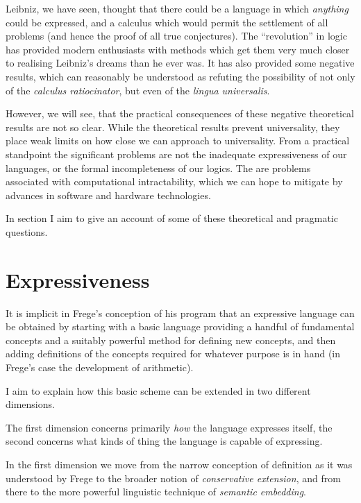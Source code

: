 Leibniz, we have seen, thought that there could be a language in which {\it anything} could be expressed, and a calculus which would permit the settlement of all problems (and hence the proof of all true conjectures).
The ``revolution'' in logic has provided modern enthusiasts with methods which get them very much closer to realising Leibniz's dreams than he ever was.
It has also provided some negative results, which can reasonably be understood as refuting the possibility of not only of the {\it calculus ratiocinator}, but even of the {\it lingua universalis}.

However, we will see, that the practical consequences of these negative theoretical results are not so clear.
While the theoretical results prevent universality, they place weak limits on how close we can approach to universality.
From a practical standpoint the significant problems are not the inadequate expressiveness of our languages, or the formal incompleteness of our logics.
The are problems associated with computational intractability, which we can hope to mitigate by advances in software and hardware technologies.

In section I aim to give an account of some of these theoretical and pragmatic questions.

\section{Expressiveness}

It is implicit in Frege's conception of his program that an expressive language can be obtained by starting with a basic language providing a handful of fundamental concepts and a suitably powerful method for defining new concepts, and then adding definitions of the concepts required for whatever purpose is in hand (in Frege's case the development of arithmetic).

I aim to explain how this basic scheme can be extended in two different dimensions.

The first dimension concerns primarily {\it how} the language expresses itself, the second concerns what kinds of thing the language is capable of expressing.

In the first dimension we move from the narrow conception of definition as it was understood by Frege to the broader notion of {\it conservative extension}, and from there to the more powerful linguistic technique of {\it semantic embedding}.

